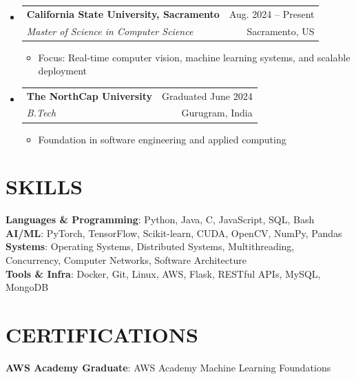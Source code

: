 \documentclass[letterpaper,10pt]{article}
\makeatletter
\newcommand{\resumeItem}[1]{
  \item\small{{#1 \vspace{-1pt}}}
}
\newcommand{\resumeSubheading}[4]{
  \vspace{-2pt}\item
  \begin{tabular*}{\textwidth}[t]{l@{\extracolsep{\fill}}r}
    \textbf{#1} & {\color{dark-grey}\small #2}\vspace{1pt}\\
    \textit{#3} & {\color{dark-grey} \small #4}\\
  \end{tabular*}\vspace{-6pt}
}
\newcommand{\resumeSubHeadingListStart}{\begin{itemize}[leftmargin=0in,label={},itemsep=2pt,topsep=3pt,parsep=0pt,partopsep=0pt]}
\newcommand{\resumeSubHeadingListEnd}{\end{itemize}}
\newcommand{\resumeItemListStart}{\begin{itemize}[leftmargin=0.2in,itemsep=2pt,topsep=2pt,parsep=0pt,partopsep=0pt]}
\newcommand{\resumeItemListEnd}{\end{itemize}\vspace{0pt}}
\makeatother
\begin{document}
\resumeSubHeadingListStart

\resumeSubheading
{California State University, Sacramento}{Aug. 2024 -- Present}
{Master of Science in Computer Science}{Sacramento, US}

\resumeItemListStart
\resumeItem{Focus: Real-time computer vision, machine learning systems, and scalable deployment}
\resumeItemListEnd

\resumeSubheading
{The NorthCap University}{Graduated June 2024}
{B.Tech}{Gurugram, India}

\resumeItemListStart
\resumeItem{Foundation in software engineering and applied computing}
\resumeItemListEnd

\resumeSubHeadingListEnd

\section{SKILLS}

\begin{itemize}[leftmargin=0in,label={}]
\small{\item{
\textbf{Languages \& Programming}: Python, Java, C, JavaScript, SQL, Bash \\
\textbf{AI/ML}: PyTorch, TensorFlow, Scikit-learn, CUDA, OpenCV, NumPy, Pandas \\
\textbf{Systems}: Operating Systems, Distributed Systems, Multithreading, Concurrency, Computer Networks, Software Architecture \\
\textbf{Tools \& Infra}: Docker, Git, Linux, AWS, Flask, RESTful APIs, MySQL, MongoDB
}}
\end{itemize}

\section{CERTIFICATIONS}

\begin{itemize}[leftmargin=0in,label={}]
\small{\item{
\textbf{AWS Academy Graduate}: AWS Academy Machine Learning Foundations
}}
\end{itemize}
\end{document}
